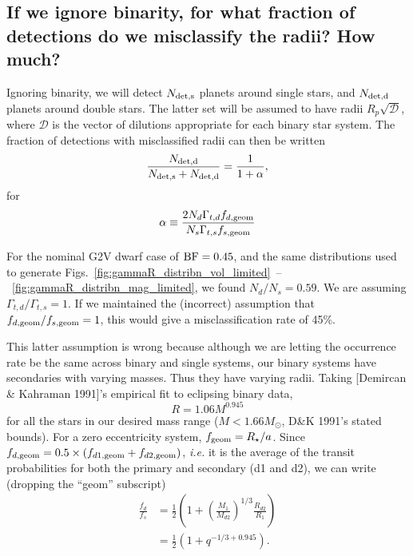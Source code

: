\documentclass{emulateapj}
\begin{document}
\subsection{If we ignore binarity, for what fraction of 
	detections do we misclassify the radii? How much?}

Ignoring binarity, we will detect $N_{\rm det,s}$ planets around single stars, 
and $N_{\rm det,d}$ planets around double stars. The latter set will be assumed 
to have radii $R_p \sqrt{\mathcal{D}}$, where $\mathcal{D}$ is the vector of 
dilutions appropriate for each binary star system.
The fraction of detections with misclassified radii can then be written
\begin{equation}
\frac{N_{\rm det,d}}{N_{\rm det,s} + N_{\rm det,d}} = \frac{1}{1+\alpha},
\end{equation}
for
\begin{equation}
\alpha \equiv 
\frac{2 N_d \Gamma_{t,d} f_{d,{\rm geom}}}{N_s \Gamma_{t,s} f_{s,{\rm geom}}}
\end{equation}

For the nominal G2V dwarf case of ${\rm BF}=0.45$, and the same distributions 
used to generate 
Figs.~\ref{fig:gammaR_distribn_vol_limited}~--~\ref{fig:gammaR_distribn_mag_limited},
we found $N_d/N_s=0.59$.
We are assuming $\Gamma_{t,d} / \Gamma_{t,s} = 1$.
If we maintained the (incorrect) assumption that $f_{d,{\rm geom}} / f_{s,{\rm 
geom}} = 1$, this would give a misclassification rate of 45\%. 

This latter assumption is wrong because although we are letting the occurrence 
rate be the same across binary and single systems, our binary systems have 
secondaries with varying masses. Thus they have varying radii.
Taking [Demircan \& Kahraman 1991]'s empirical fit to eclipsing binary data,
\begin{equation}
R = 1.06 M^{0.945}
\label{eq:mass_radius}
\end{equation}
for all the stars in our desired mass range ($M < 1.66M_\odot$, D\&K 1991's 
stated bounds).
For a zero eccentricity system, $f_{\rm geom}=R_\star/a$.
Since $f_{d,{\rm geom}} = 0.5\times (f_{d1,{\rm geom}} + f_{d2,{\rm geom}})$, 
\textit{i.e.} it is the average of the transit probabilities for both the 
primary and secondary (d1 and d2), we can write (dropping the ``geom'' 
subscript)
\begin{align}
\frac{f_d}{f_s} &= \frac{1}{2} \left(1 + \left(\frac{M_1}{M_{d2}}\right)^{1/3} 
\frac{R_{d2}}{R_1}\right) \\
&= \frac{1}{2} \left( 1 + q^{-1/3 + 0.945}\right).
\end{align}
\end{document}
